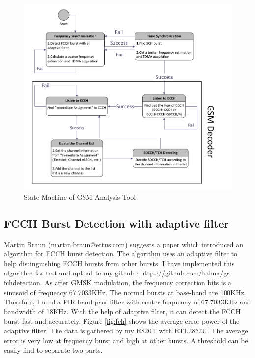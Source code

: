 \documentclass[a4paper,12pt,oneside]{article}
\begin{document}
\begin{figure}[!h]
\centering\includegraphics[width=6.4in]{figure/state_machine.pdf}
\caption{State Machine of GSM Analysis Tool \label{fig:3}}
\end{figure}


\subsection{FCCH Burst Detection with adaptive filter}
Martin Braun (martin.braun@ettus.com) suggests a paper \cite{1404796} which introduced an algorithm for FCCH burst detection. The algorithm uses an adaptive filter to help distinguishing FCCH bursts from other bursts. I have implemented this algorithm for test and upload to my github : {\color{blue}\url{https://github.com/hzhua/gr-fchdetection}}.
As after GMSK modulation, the frequency correction bits is a sinusoid of frequency 67.7033KHz. The normal bursts at base-band are 100KHz.
Therefore, I used a FIR band pass filter with center frequency of 67.7033KHz and bandwidth of 18KHz. With the help of adaptive filter, it can detect
the FCCH burst fast and accurately. Figure \ref{fig:fch} shows the average error power of the adaptive filter. The data is gathered by my R820T with RTL2832U. The average error is very low
at frequency burst and high at other bursts. A threshold can be easily find to separate two parts.
\end{document}
